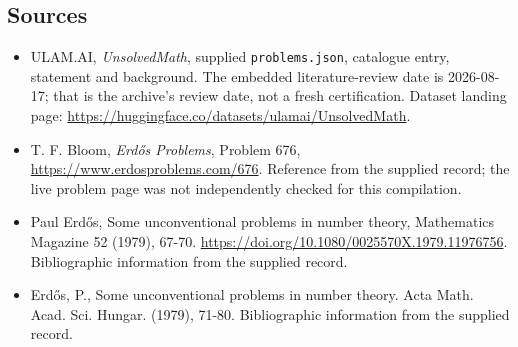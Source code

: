\documentclass[11pt,a4paper]{article}
\begin{document}
\subsection{Sources}

{\small

\begin{itemize}

\item[\hypertarget{source:statement:1}{S1}] ULAM.AI, \emph{UnsolvedMath}, supplied \texttt{problems.json}, catalogue entry, statement and background. The embedded literature-review date is 2026-08-17; that is the archive’s review date, not a fresh certification. Dataset landing page: \url{https://huggingface.co/datasets/ulamai/UnsolvedMath}.

\item[\hypertarget{source:statement:2}{S2}] T. F. Bloom, \emph{Erdős Problems}, Problem 676, \url{https://www.erdosproblems.com/676}. Reference from the supplied record; the live problem page was not independently checked for this compilation.

\item[\hypertarget{source:statement:3}{S3}] Paul Erdős, Some unconventional problems in number theory, Mathematics Magazine 52 (1979), 67-70. \url{https://doi.org/10.1080/0025570X.1979.11976756}. Bibliographic information from the supplied record.

\item[\hypertarget{source:statement:4}{S4}] Erd\H{o}s, P., Some unconventional problems in number theory. Acta Math. Acad. Sci. Hungar. (1979), 71-80. Bibliographic information from the supplied record.

\end{itemize}

}

\label{end:statement}
\end{document}
